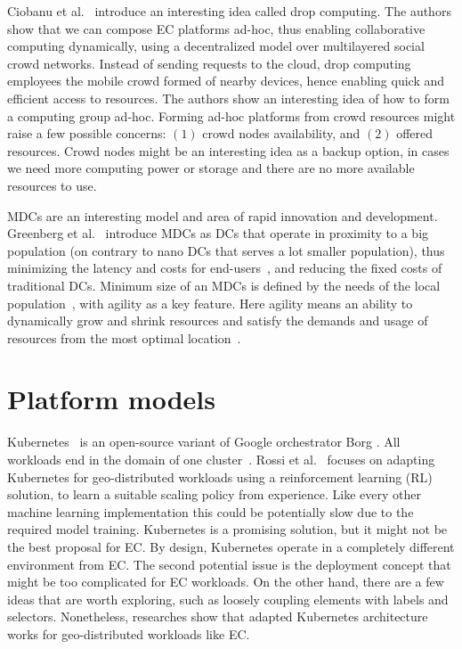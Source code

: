 Ciobanu et al.~\cite{CiobanuNPDMM19} introduce an interesting idea called drop computing. The authors show that we can compose EC platforms ad-hoc, thus enabling collaborative computing dynamically, using a decentralized model over multilayered social crowd networks. Instead of sending requests to the cloud, drop computing employees the mobile crowd formed of nearby devices, hence enabling quick and efficient access to resources. The authors show an interesting idea of how to form a computing group ad-hoc. Forming ad-hoc platforms from crowd resources might raise a few possible concerns: $(1)$ crowd nodes availability, and $(2)$ offered resources. Crowd nodes might be an interesting idea as a backup option, in cases we need more computing power or storage and there are no more available resources to use.

MDCs are an interesting model and area of rapid innovation and development. Greenberg et al.~\cite{GreenbergHMP09} introduce MDCs as DCs that operate in proximity to a big population (on contrary to nano DCs that serves a lot smaller population), thus minimizing the latency and costs for end-users~\cite{ShiHPANZ14, GreenbergHMP09}, 
and reducing the fixed costs of traditional DCs. Minimum size of an MDCs is defined by the needs of the local population~\cite{GreenbergHMP09, AbbasZTS18}, with agility as a key feature. Here agility means an ability to dynamically grow and shrink resources and satisfy the demands and usage of resources from the most optimal location~\cite{GreenbergHMP09}.
%
%
\section{Platform models}\label{sec:platform_models}
%
Kubernetes~\cite{BurnsGOBW16} is an open-source variant of Google orchestrator Borg \cite{VermaPKOTW15}.  All workloads end in the domain of one cluster~\cite{BurnsGOBW16, VermaPKOTW15, RossiCPN20}. Rossi et al.~\cite{RossiCPN20} focuses on adapting Kubernetes for geo-distributed workloads using a reinforcement learning (RL) solution, to learn a suitable scaling policy from experience. Like every other machine learning implementation this could be potentially slow due to the required model training. Kubernetes is a promising solution, but it might not be the best proposal for EC. By design, Kubernetes operate in a completely different environment from EC. The second potential issue is the deployment concept that might be too complicated for EC workloads. On the other hand, there are a few ideas that are worth exploring, such as loosely coupling elements with labels and selectors. Nonetheless, researches show that adapted Kubernetes architecture works for geo-distributed workloads like EC.

